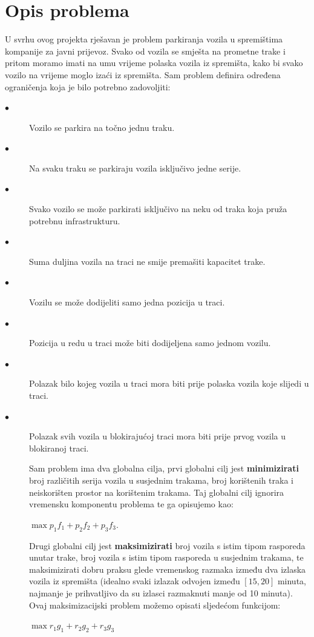 \documentclass[11pt]{article}
\begin{document}
\section{Opis problema}
U svrhu ovog projekta rješavan je problem parkiranja vozila u spremištima kompanije za javni prijevoz. Svako od vozila se smješta na prometne trake i pritom moramo imati na umu vrijeme polaska vozila iz spremišta, kako bi svako vozilo na vrijeme moglo izaći iz spremišta. Sam problem definira određena ograničenja koja je bilo potrebno zadovoljiti:
\begin{description}
\item[$\bullet$] Vozilo se parkira na točno jednu traku.
\item[$\bullet$] Na svaku traku se parkiraju vozila isključivo jedne serije.
\item[$\bullet$] Svako vozilo se može parkirati isključivo na neku od traka koja pruža potrebnu infrastrukturu.
\item[$\bullet$] Suma duljina vozila na traci ne smije premašiti kapacitet trake.
\item[$\bullet$] Vozilu se može dodijeliti samo jedna pozicija u traci.
\item[$\bullet$] Pozicija u redu u traci može biti dodijeljena samo jednom vozilu.
\item[$\bullet$] Polazak bilo kojeg vozila u traci mora biti prije polaska vozila koje slijedi u traci.
\item[$\bullet$] Polazak svih vozila u blokirajućoj traci mora biti prije prvog vozila u blokiranoj traci.

Sam problem ima dva globalna cilja, prvi globalni cilj jest \textbf{minimizirati} broj različitih serija vozila u susjednim trakama, broj korištenih traka i neiskorišten prostor na korištenim trakama. Taj globalni cilj ignorira vremensku komponentu problema te ga opisujemo kao: \\
\begin{center}
$\max p_1f_1 + p_2f_2 + p_3f_3$.\\
\label{max-fun}
\end{center}


Drugi globalni cilj jest \textbf{maksimizirati} broj vozila s istim tipom rasporeda unutar trake, broj vozila s istim tipom rasporeda u susjednim trakama, te maksimizirati dobru praksu glede vremenskog razmaka između dva izlaska vozila iz spremišta (idealno svaki izlazak odvojen između $[15,20]$ minuta, najmanje je prihvatljivo da su izlasci razmaknuti manje od 10 minuta).
Ovaj maksimizacijski problem možemo opisati sljedećom funkcijom:
\begin{center}
$\max r_1g_1 + r_2g_2 + r_3g_3$
\label{min-fun}
\end{center}


\end{description}
\end{document}
